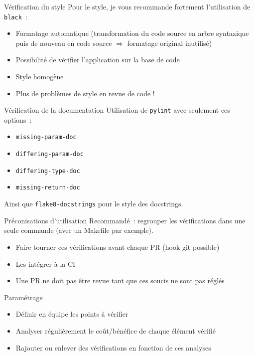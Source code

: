 \begin{frame}{Vérification du style}
  Pour le style, je vous recommande fortement l'utilisation de \texttt{black}~:

  \begin{itemize}
    \item Formatage automatique (transformation du code source en arbre syntaxique puis de nouveau en code source $\Rightarrow$ formatage original inutilisé)
    \item Possibilité de vérifier l'application sur la base de code
    \item Style homogène
    \item Plus de problèmes de style en revue de code !
  \end{itemize}
\end{frame}

\begin{frame}{Vérification de la documentation}
  Utilisation de \texttt{pylint} avec seulement ces options~:

  \begin{itemize}
    \item \texttt{missing-param-doc}
    \item \texttt{differing-param-doc}
    \item \texttt{differing-type-doc}
    \item \texttt{missing-return-doc}
  \end{itemize}

  Ainsi que \texttt{flake8-docstrings} pour le style des docstrings.
\end{frame}

\begin{frame}{Préconisations d'utilisation}
  Recommandé~: regrouper les vérifications dans une seule commande (avec un Makefile par exemple).

  \begin{itemize}
    \item Faire tourner ces vérifications avant chaque PR (hook git possible)
    \item Les intégrer à la CI
    \item \alert{Une PR ne doit pas être revue tant que ces soucis ne sont pas réglés}
  \end{itemize}
\end{frame}

\begin{frame}{Paramétrage}
  \begin{itemize}
    \item Définir en équipe les points à vérifier
    \item Analyser régulièrement le coût/bénéfice de chaque élément vérifié
    \item Rajouter ou enlever des vérifications en fonction de ces analyses
  \end{itemize}
\end{frame}

